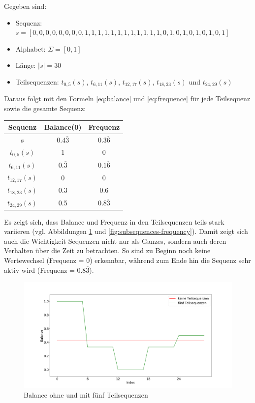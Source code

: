 \begin{theorem}
Gegeben sind:
\begin{itemize}[noitemsep]
	\item Sequenz: $s = [0,0,0,0,0,0,0,0,1,1,1,1,1,1,1,1,1,1,1,1,0,1,0,1,0,1,0,1,0,1]$
	\item Alphabet: $\Sigma = [0,1]$
	\item Länge: $|s| = 30$
	\item Teilsequenzen: $t_{0,5}(s)$, $t_{6,11}(s)$, $t_{12,17}(s)$, $t_{18,23}(s)$ und $t_{24,29}(s)$
\end{itemize}
Daraus folgt mit den Formeln \ref{eq:balance} und \ref{eq:frequence} für jede Teilsequenz sowie die gesamte Sequenz:

\begin{center}
	\begin{tabular}{|c c c|}
		\hline
		Sequenz & Balance(0) & Frequenz \\
		\hline\hline
		s & $0.4\overline{3}$ & $0.3\overline{6}$ \\ 
		\hline
		$t_{0,5}(s)$ & 1 & 0 \\ 
		\hline
		$t_{6,11}(s)$ & $0.\overline{3}$ & $0.1\overline{6}$ \\
		\hline
		$t_{12,17}(s)$ & 0 & 0 \\
		\hline
		$t_{18,23}(s)$ & $0.\overline{3}$ & $0.\overline{6}$ \\
		\hline
		$t_{24,29}(s)$ & 0.5 & $0.8\overline{3}$ \\
		\hline
	\end{tabular}
\end{center}



Es zeigt sich, dass Balance und Frequenz in den Teilsequenzen teils stark variieren (vgl. Abbildungen \ref{fig:subsequences-balance} und \ref{fig:subsequences-frequency}). Damit zeigt sich auch die Wichtigkeit Sequenzen nicht nur als Ganzes, sondern auch deren Verhalten über die Zeit zu betrachten. So sind zu Beginn noch keine Wertewechsel (Frequenz = 0) erkennbar, während zum Ende hin die Sequenz sehr aktiv wird (Frequenz = 0.8$\overline{3}$).

\begin{figure}[H]
	\centering
	\includegraphics[scale=0.32]{images/Teilsequenzen/teilsequenzen_balance}
	\caption{Balance ohne und mit fünf Teilsequenzen}
	\label{fig:subsequences-balance}
\end{figure}


\end{theorem}

